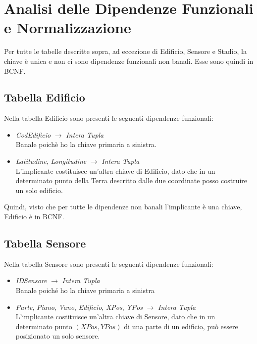 \documentclass[12pt,a4paper]{report}
\begin{document}
    \chapter{Analisi delle Dipendenze Funzionali e Normalizzazione}
        
        Per tutte le tabelle descritte sopra, ad eccezione di Edificio, Sensore e Stadio, la chiave è unica e non ci sono dipendenze funzionali non banali. Esse sono quindi in BCNF.
        
        \section{Tabella Edificio}
        
        Nella tabella Edificio sono presenti le seguenti dipendenze funzionali:

        \begin{itemize}
            \item \emph{CodEdificio} $\rightarrow$ \emph{Intera Tupla} \\ Banale poichè ho la chiave primaria a sinistra.
            
            \item \emph{Latitudine}, \emph{Longitudine} $\rightarrow$ \emph{Intera Tupla} \\ L’implicante costituisce un’altra chiave di Edificio, dato che in un determinato punto della Terra descritto dalle due coordinate posso costruire un solo edificio.
        \end{itemize}

        Quindi, visto che per tutte le dipendenze non banali l'implicante è una chiave, Edificio è in BCNF.

        \section{Tabella Sensore}
        
        Nella tabella Sensore sono presenti le seguenti dipendenze funzionali:

        \begin{itemize}
            \item \emph{IDSensore} $\rightarrow$ \emph{Intera Tupla} \\ Banale poiché ho la chiave primaria a sinistra
            
            \item \emph{Parte}, \emph{Piano}, \emph{Vano}, \emph{Edificio}, \emph{XPos}, \emph{YPos} $\rightarrow$ \emph{Intera Tupla} \\ L’implicante costituisce un’altra chiave di Sensore, dato che in un determinato punto $(XPos, YPos)$ di una parte di un edificio, può essere posizionato un solo sensore. 
        \end{itemize}
\end{document}

